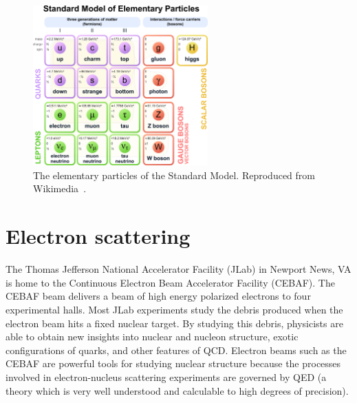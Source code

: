 \begin{figure}[!h]
    \centering
    \includegraphics[width=0.6\textwidth]{chap1/Standard_Model_of_Elementary_Particles.pdf}
    \caption{The elementary particles of the Standard Model. Reproduced from
             Wikimedia~\cite{standard_model_wikimedia}.
            }
    \label{fig:Standard_Model_of_Elementary_Particles}
\end{figure}


\section{Electron scattering}
The Thomas Jefferson National Accelerator Facility (JLab) in Newport News, VA
is home to the Continuous Electron Beam Accelerator Facility (CEBAF).
The CEBAF beam delivers a beam of high energy polarized electrons to four
experimental halls.
Most JLab experiments study the debris produced when the electron beam
hits a fixed nuclear target.
By studying this debris, physicists are able to obtain new insights into
nuclear and nucleon structure, exotic configurations of quarks, and other
features of QCD.
Electron beams such as the CEBAF are powerful tools for studying nuclear
structure
because the processes involved in electron-nucleus scattering experiments are
governed by QED (a theory which is very well understood and calculable to high
degrees of precision).

